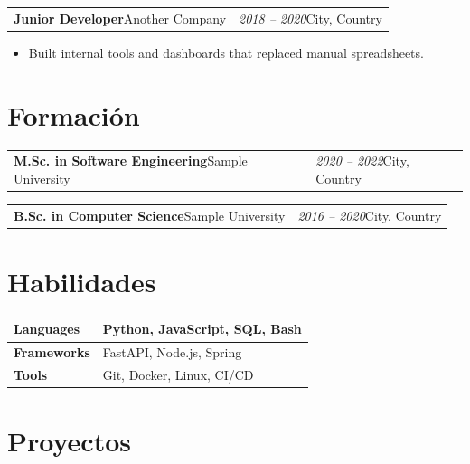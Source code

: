 \documentclass[11pt,a4paper]{article}
\makeatletter
\newcommand{\lblEducation}{Education}
\newcommand{\lblSkills}{Skills}
\newcommand{\lblProjects}{Projects}
\renewcommand{\lblEducation}{Formación}
\renewcommand{\lblSkills}{Habilidades}
\renewcommand{\lblProjects}{Proyectos}
\newcommand{\cventry}[4]{%
  \begin{tabularx}{\textwidth}{@{}>{\raggedright\arraybackslash}X>{\raggedleft\arraybackslash}p{4.2cm}@{}}
    \textbf{#1}\newline #2 & \textit{#3}\newline #4 \\
  \end{tabularx}\vspace{-2pt}%
}
\makeatother
\begin{document}
  \cventry{Junior Developer}{Another Company}{2018 -- 2020}{City, Country}
  \begin{itemize}
    \item Built internal tools and dashboards that replaced manual spreadsheets.
  \end{itemize}

  \section*{\lblEducation}

  \cventry{M.Sc. in Software Engineering}{Sample University}{2020 -- 2022}{City, Country}
  \cventry{B.Sc. in Computer Science}{Sample University}{2016 -- 2020}{City, Country}

  \section*{\lblSkills}
  {\renewcommand{\arraystretch}{1.2}%
    \begin{tabularx}{\textwidth}{@{}>{\bfseries}p{3.2cm}>{\raggedright\arraybackslash}X@{}}
      Languages & Python, JavaScript, SQL, Bash \\
      \midrule
      Frameworks & FastAPI, Node.js, Spring \\
      \midrule
      Tools & Git, Docker, Linux, CI/CD \\
      \bottomrule
    \end{tabularx}}

  \section*{\lblProjects}
\end{document}
